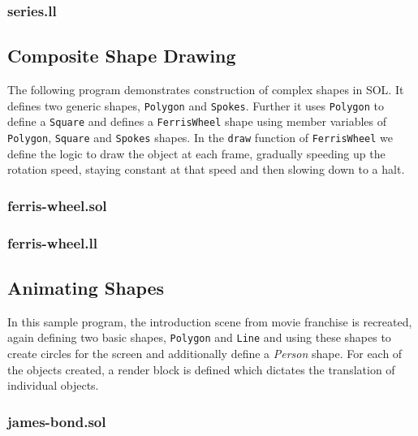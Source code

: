 \documentclass[letterpaper,12pt]{report}
\begin{document}
    \subsubsection{series.ll}
    

    \subsection{Composite Shape Drawing}
    The following program demonstrates construction of complex shapes in SOL. It defines two generic shapes, \texttt{Polygon} and \texttt{Spokes}. Further it uses \texttt{Polygon} to define a \texttt{Square} and defines a \texttt{FerrisWheel} shape using member variables of \texttt{Polygon}, \texttt{Square} and \texttt{Spokes} shapes. In the \texttt{draw} function of \texttt{FerrisWheel} we define the logic to draw the object at each frame, gradually speeding up the rotation speed, staying constant at that speed and then slowing down to a halt.

    \subsubsection{ferris-wheel.sol}
    

    \subsubsection{ferris-wheel.ll}
    

    \subsection{Animating Shapes}
    In this sample program, the introduction scene from  movie franchise is recreated, again defining two basic shapes, \texttt{Polygon} and \texttt{Line} and using these shapes to create circles for the screen and additionally define a \textit{Person} shape. For each of the objects created, a render block is defined which dictates the translation of individual objects.

    \subsubsection{james-bond.sol}
    
\end{document}
